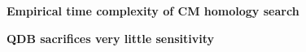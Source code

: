 \documentclass[landscape]{slides}
\begin{document}
\begin{slide}
\begin{center}
\textbf{Empirical time complexity of CM homology search}
\end{center}


\vfill
\end{slide}

\begin{slide}
\begin{center}
\textbf{QDB sacrifices very little sensitivity}
\end{center}


\vfill
\end{slide}
\end{document}
